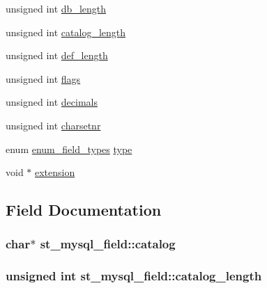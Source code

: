 \begin{DoxyCompactItemize}
unsigned int \hyperlink{structst__mysql__field_abe39f84a0bf3580baefe02d1af84b176}{db\+\_\+length}
\item 
unsigned int \hyperlink{structst__mysql__field_a72598be1e648074291e3d8efd1a33d76}{catalog\+\_\+length}
\item 
unsigned int \hyperlink{structst__mysql__field_a6698d0723c7d4349a707fc2bed3641d5}{def\+\_\+length}
\item 
unsigned int \hyperlink{structst__mysql__field_a2977653fe904c10974aeda70fdde5ba2}{flags}
\item 
unsigned int \hyperlink{structst__mysql__field_ab39f6f0fb49ba3ce21522b68f41b4337}{decimals}
\item 
unsigned int \hyperlink{structst__mysql__field_a687f7df1f421ac5273adfc06b244c883}{charsetnr}
\item 
enum \hyperlink{mysql__com_8h_a69e798807026a0f7e12b1d6c72374854}{enum\+\_\+field\+\_\+types} \hyperlink{structst__mysql__field_a3b744bf19e92b619e725b45f83a78771}{type}
\item 
void $\ast$ \hyperlink{structst__mysql__field_a3e03bdbb5de8f5bf461a3591827a3760}{extension}
\end{DoxyCompactItemize}


\subsection{Field Documentation}
\hypertarget{structst__mysql__field_a5efd1f038fd402730cd69b9b0be93ac6}{}
\subsubsection[{catalog}]{\setlength{\rightskip}{0pt plus 5cm}char$\ast$ st\+\_\+mysql\+\_\+field\+::catalog}\label{structst__mysql__field_a5efd1f038fd402730cd69b9b0be93ac6}
\hypertarget{structst__mysql__field_a72598be1e648074291e3d8efd1a33d76}{}
\subsubsection[{catalog\+\_\+length}]{\setlength{\rightskip}{0pt plus 5cm}unsigned int st\+\_\+mysql\+\_\+field\+::catalog\+\_\+length}\label{structst__mysql__field_a72598be1e648074291e3d8efd1a33d76}
\hypertarget{structst__mysql__field_a687f7df1f421ac5273adfc06b244c883}{}
